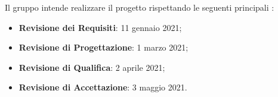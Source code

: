 Il gruppo \Gruppo{} intende realizzare il progetto \NomeProgetto{} rispettando le seguenti principali :
\begin{itemize}
    \item \textbf{Revisione dei Requisiti}: 11 gennaio 2021;
    \item \textbf{Revisione di Progettazione}: 1 marzo 2021;
    \item \textbf{Revisione di Qualifica}: 2 aprile 2021;
    \item \textbf{Revisione di Accettazione}: 3 maggio 2021.
\end{itemize}